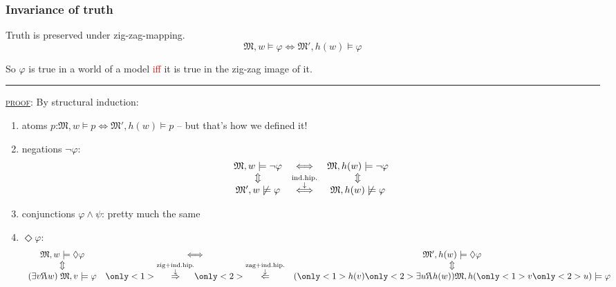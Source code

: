 \documentclass[xcolor=x11names]{beamer}
\newcommand{\cemph}[1]{\textcolor{red}{#1}}
\newcommand{\dzsa}[1]{\textsc{\underline{#1}}:}
\newcommand{\magyarazat}[2]{\overset{\substack{\textup{#2}\\ \downarrow}}{#1}}
\newcommand{\seenby}{\reflectbox {$R$}}
\begin{document}

\begin{frame}
\frametitle{Invariance of truth}
\scriptsize
Truth is preserved under zig-zag-mapping.
\[ \mathfrak M , w \models \varphi \iff \mathfrak M' , h(w) \models \varphi \]

\textup{So $\varphi$
is true in a world of a model} %
\cemph{\textup{iff}} %
\textup{it is true in the zig-zag image of it.}

\medskip
\hrule
\medskip

\dzsa{proof} By structural induction:
\begin{enumerate}\scriptsize
	\item atoms $p$:\qquad  $\mathfrak M , w \models p \iff \mathfrak M' , h(w) \models p$ -- but that's how we defined it!
	\item negations $\lnot\varphi$:
		\[ \begin{array}{ccccc}
		\mathfrak M , w \models \lnot \varphi
		&  \iff
		& \mathfrak M , h(w) \models \lnot \varphi
\\		\Updownarrow && \Updownarrow
\\[-1em]		\mathfrak M' , w \not \models \varphi
		&	\magyarazat{\iff}{ind.hip.}
		&	\mathfrak M , h(w) \not \models \varphi
		\end{array}\]
	\item conjunctions $\varphi \land\psi$: pretty much the same
	\item $\Diamond \varphi$:
		{\footnotesize
		\[ \begin{array}{ccccc}
		\mathfrak M , w \models \Diamond \varphi
		&  \iff
		&	\mathfrak M' , h(w) \models \Diamond \varphi
\\		\Updownarrow && \Updownarrow
\\[-1em]		(\exists v\seenby w)\; \mathfrak M , v \models \varphi
		&	\only<1>{\magyarazat{\Rightarrow}{zig+ind.hip.}}
						\only<2>{\magyarazat{\Leftarrow}{zag+ind.hip.}}
		&	(\only<1>{h(v)}\only<2>{\exists u}\seenby h(w)) \mathfrak M , h(\only<1>{v}\only<2>{u}) \models \varphi
		\end{array}\]}
\end{enumerate}
\end{frame}

\end{document}
